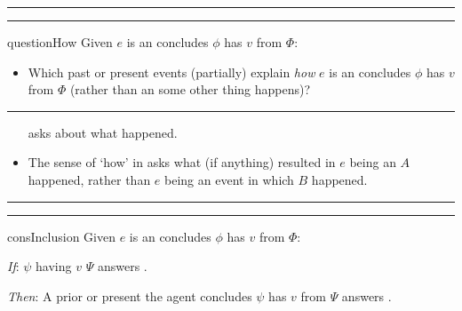 \documentclass[10pt]{article}
\newcommand\lLine{{\color{lightgray} \noindent\rule{\textwidth}{0.4pt}}}
\newcommand\sepLine{
  \vfill
  \par\noindent\rule{\textwidth}{0.4pt}%
  \vspace{-10pt}%
  \par\noindent\rule{\textwidth}{0.4pt}
  \vfill}
\newcommand{\hand}{\ding{43}}
\begin{document}
\sepLine

\begin{note}
  \begin{question}{questionHow}{\qHow{}}
    Given \(e\) is an  \vAgent{} concludes \prop{} \(\phi\) has \val{} \(v\) from \pool{} \(\Phi\):
    \begin{itemize}
    \item
      Which past or present events (partially) explain \emph{how} \(e\) is an  \vAgent{} concludes \prop{} \(\phi\) has \val{} \(v\) from \pool{} \(\Phi\) (rather than an  some other thing happens)?
    \end{itemize}
    \vspace{-1.5\baselineskip}
  \end{question}
\end{note}

\lLine

\begin{note}
  \begin{itemize}
  \item[\hand]
    \qHow{} asks about what happened.
  \end{itemize}

  \begin{itemize}
  \item
    The sense of `how' in \qHow{} asks what (if anything) resulted in \(e\) being an \eiw{} \(A\) happened, rather than \(e\) being an event in which \(B\) happened.
  \end{itemize}
\end{note}

\sepLine

\begin{note}
  \begin{constraint}{consInclusion}{\issueInclusion{}}
    Given \(e\) is an  \vAgent{} concludes \prop{} \(\phi\) has \val{} \(v\) from \pool{} \(\Phi\):
    \begin{itenum}
    \item[\emph{If}:]
       \(\psi\) having \val{} \(v\) \fingf{} \pool{} \(\Psi\) answers \qWhy{}.
    \item[\emph{Then}:]
      A prior or present  the agent concludes \(\psi\) has \val{} \(v\) from \pool{} \(\Psi\) answers \qHow{}.
    \end{itenum}
    \vspace{-\baselineskip}
  \end{constraint}
\end{note}
\end{document}
